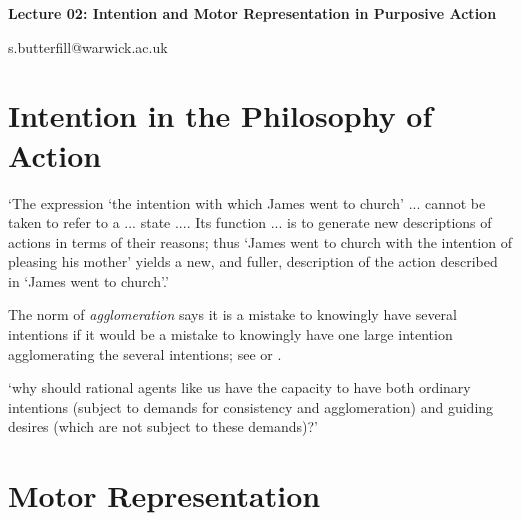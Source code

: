 \documentclass[12pt]{extarticle}
\date{}
\makeatletter
\def \ititle {Origins of Mind}
\def \iemail{s.butterfill@warwick.ac.uk}
\makeatother
\begin{document}
\begin{multicols*}{3}

\setlength\footnotesep{1em}











\def \ititle {Lecture 02: Intention and Motor Representation in Purposive Action}

\begin{center}

{\Large

\textbf{\ititle}

}



\iemail %

\end{center}



\section{Intention in the Philosophy of Action}

‘The expression ‘the intention with which James went to church’ ... cannot be taken to refer to a
... state .... Its function ... is to generate new descriptions of actions in terms of their
reasons; thus ‘James went to church with the intention of pleasing his mother’ yields a new, and
fuller, description of the action described in ‘James went to church’.’
\citep[p.~690]{davidson:1963_orig}

The norm of \emph{agglomeration} says it is a mistake to knowingly have several intentions if it
would be a mistake to knowingly have one large intention agglomerating the several intentions; see
\citet{Bratman:1987xw} or \citet[§4]{setiya:2014_intention}.

‘why should rational agents like us have the capacity to have both ordinary intentions (subject to
demands for consistency and agglomeration) and guiding desires (which are not subject to these
demands)?’ \citep[pp.~137–8]{Bratman:1987xw}



\section{Motor Representation}


\end{multicols*}
\end{document}
